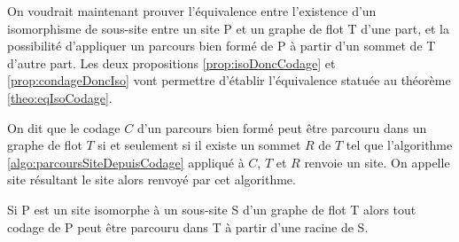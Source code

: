 On voudrait maintenant prouver l'équivalence entre l'existence d'un isomorphisme de sous-site entre un site P et un graphe de flot T d'une part, et la possibilité d'appliquer un parcours bien formé de P à partir d'un sommet de T d'autre part. Les deux propositions \ref{prop:isoDoncCodage} et \ref{prop:condageDoncIso} vont permettre d'établir l'équivalence statuée au théorème \ref{theo:eqIsoCodage}.


\begin{defi}
 On dit que le codage $C$ d'un parcours bien formé peut être parcouru dans un graphe de flot $T$ si et seulement si il existe un sommet $R$ de $T$ tel que l'algorithme \ref{algo:parcoursSiteDepuisCodage} appliqué à $C$, $T$ et $R$ renvoie un site. On appelle site résultant le site alors renvoyé par cet algorithme.
\label{def:parcours_site_gf}
\end{defi}

\FloatBarrier

\begin{prop}
 Si P est un site isomorphe à un sous-site S d'un graphe de flot T alors tout codage de P peut être parcouru dans T à partir d'une racine de S.
 \label{prop:isoDoncCodage}
\end{prop}


